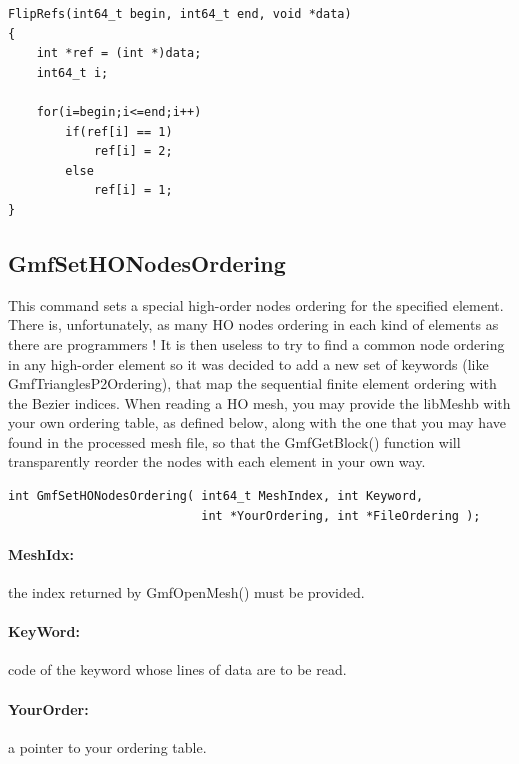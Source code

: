 \documentclass[a4paper,12pt]{article}
\begin{document}
\begin{tt}
\begin{verbatim}
FlipRefs(int64_t begin, int64_t end, void *data)
{
    int *ref = (int *)data;
    int64_t i;

    for(i=begin;i<=end;i++)
        if(ref[i] == 1)
            ref[i] = 2;
        else
            ref[i] = 1;
}
\end{verbatim}
\end{tt}
\normalfont


\subsection{GmfSetHONodesOrdering}
This command sets a special high-order nodes ordering for the specified element.
There is, unfortunately, as many HO nodes ordering in each kind of elements as there are programmers !
It is then useless to try to find a common node ordering in any high-order element so it was decided to add a new set of keywords (like GmfTrianglesP2Ordering), that map the sequential finite element ordering with the Bezier indices.
When reading a HO mesh, you may provide the libMeshb with your own ordering table, as defined below, along with the one that you may have found in the processed mesh file, so that the GmfGetBlock() function will transparently reorder the nodes with each element in your own way.

\begin{tt}
\begin{verbatim}
int GmfSetHONodesOrdering( int64_t MeshIndex, int Keyword,
                           int *YourOrdering, int *FileOrdering );
\end{verbatim}
\end{tt}
\normalfont

\paragraph{MeshIdx:}
the index returned by GmfOpenMesh() must be provided.

\paragraph{KeyWord:} code of the keyword whose lines of data are to be read.

\paragraph{YourOrder:} a pointer to your ordering table.
\end{document}
